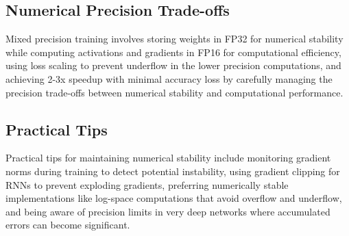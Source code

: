 \subsection{Numerical Precision Trade-offs}

Mixed precision training involves storing weights in FP32 for numerical stability while computing activations and gradients in FP16 for computational efficiency, using loss scaling to prevent underflow in the lower precision computations, and achieving 2-3x speedup with minimal accuracy loss by carefully managing the precision trade-offs between numerical stability and computational performance.

\subsection{Practical Tips}

Practical tips for maintaining numerical stability include monitoring gradient norms during training to detect potential instability, using gradient clipping for RNNs to prevent exploding gradients, preferring numerically stable implementations like log-space computations that avoid overflow and underflow, and being aware of precision limits in very deep networks where accumulated errors can become significant.
